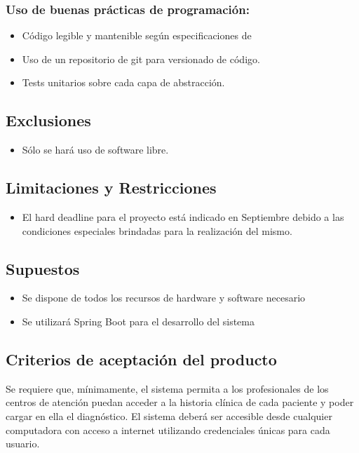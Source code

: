\documentclass[a4paper, 10pt, oneside]{book}
\begin{document}
    \subsubsection{Uso de buenas prácticas de programación:}\label{subsec:usoBuenasPracticasProgramacion}
    \begin{itemize}
        \item Código legible y mantenible según especificaciones de~\cite{martin2009clean}
        \item Uso de un repositorio de git para versionado de código.
        \item Tests unitarios sobre cada capa de abstracción.
    \end{itemize}

    \subsection{Exclusiones}\label{subsec:exclusiones}
    \begin{itemize}
        \item Sólo se hará uso de software libre.
    \end{itemize}

    \subsection{Limitaciones y Restricciones}\label{subsec:limitacionesYRestricciones}
    \begin{itemize}
        \item El hard deadline para el proyecto está indicado en Septiembre debido a las condiciones especiales brindadas para la realización del mismo.
    \end{itemize}

    \subsection{Supuestos}\label{subsec:supuestos}
    \begin{itemize}
        \item Se dispone de todos los recursos de hardware y software necesario
        \item Se utilizará Spring Boot para el desarrollo del sistema
    \end{itemize}

    \subsection{Criterios de aceptación del producto}\label{subsec:criterioAceptacion}
    Se requiere que, mínimamente, el sistema permita a los profesionales de los centros de atención puedan acceder a la historia clínica de cada paciente y poder cargar en ella el diagnóstico.
    El sistema deberá ser accesible desde cualquier computadora con acceso a internet utilizando credenciales únicas para cada usuario.
\end{document}
